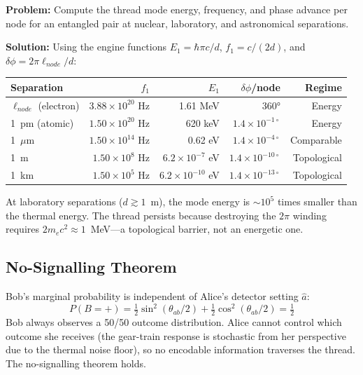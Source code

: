 \begin{examplebox}
\textbf{Problem:} Compute the thread mode energy, frequency, and phase advance per node for an entangled pair at nuclear, laboratory, and astronomical separations.

\textbf{Solution:} Using the engine functions $E_1 = \hbar\pi c/d$, $f_1 = c/(2d)$, and $\delta\phi = 2\pi\ell_{node}/d$:

\begin{center}
\small
\renewcommand{\arraystretch}{1.2}
\begin{tabular}{lrrrr}
\toprule
\textbf{Separation} & \textbf{$f_1$} & \textbf{$E_1$} & \textbf{$\delta\phi$/node} & \textbf{Regime} \\
\midrule
$\ell_{node}$ (electron) & $3.88 \times 10^{20}$ Hz & 1.61 MeV & $360°$ & Energy \\
1~pm (atomic) & $1.50 \times 10^{20}$ Hz & 620 keV & $1.4 \times 10^{-1\circ}$ & Energy \\
1~$\mu$m & $1.50 \times 10^{14}$ Hz & 0.62 eV & $1.4 \times 10^{-4\circ}$ & Comparable \\
1~m & $1.50 \times 10^{8}$ Hz & $6.2 \times 10^{-7}$ eV & $1.4 \times 10^{-10\circ}$ & Topological \\
1~km & $1.50 \times 10^{5}$ Hz & $6.2 \times 10^{-10}$ eV & $1.4 \times 10^{-13\circ}$ & Topological \\
\bottomrule
\end{tabular}
\end{center}

At laboratory separations ($d \gtrsim 1$~m), the mode energy is $\sim 10^5$ times smaller than the thermal energy. The thread persists because destroying the $2\pi$ winding requires $2m_ec^2 \approx 1$~MeV---a topological barrier, not an energetic one.
\end{examplebox}

\subsection{No-Signalling Theorem}
\label{subsec:no_signaling}
Bob's marginal probability is independent of Alice's detector setting $\hat{a}$:
\begin{equation}
    P(B{=}+) = \tfrac{1}{2}\sin^2(\theta_{ab}/2) + \tfrac{1}{2}\cos^2(\theta_{ab}/2) = \tfrac{1}{2}
\end{equation}
Bob always observes a 50/50 outcome distribution. Alice cannot control which outcome she receives (the gear-train response is stochastic from her perspective due to the thermal noise floor), so no encodable information traverses the thread. The no-signalling theorem holds.

